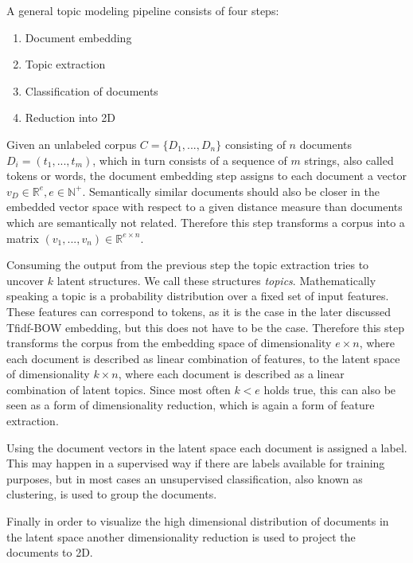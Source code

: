 A general topic modeling pipeline consists of four steps: 
\begin{enumerate}
	\item Document embedding
	\item Topic extraction
	\item Classification of documents
	\item Reduction into 2D
\end{enumerate}

Given an unlabeled corpus $C = \{D_1, ..., D_n\}$ consisting of $n$ documents $D_i = (t_1, ..., t_m)$, which in turn consists of a sequence of $m$ strings, also called tokens or words, the document embedding step assigns to each document a vector $v_D \in \mathbb{R}^e, e \in \mathbb{N}^+$. Semantically similar documents should also be closer in the embedded vector space with respect to a given distance measure than documents which are semantically not related. Therefore this step transforms a corpus into a matrix $(v_1, ..., v_n) \in \mathbb{R}^{e \times n}$.

Consuming the output from the previous step the topic extraction tries to uncover $k$ latent structures. We call these structures \textit{topics}. Mathematically speaking a topic is a probability distribution over a fixed set of input features. \cite{liuOverviewTopicModeling2016} These features can correspond to tokens, as it is the case in the later discussed Tfidf-BOW embedding, but this does not have to be the case. Therefore this step transforms the corpus from the embedding space of dimensionality $e \times n$, where each document is described as linear combination of features, to the latent space of dimensionality $k \times n$, where each document is described as a linear combination of latent topics. Since most often $k < e$ holds true, this can also be seen as a form of dimensionality reduction, which is again a form of feature extraction.

Using the document vectors in the latent space each document is assigned a label. This may happen in a supervised way if there are labels available for training purposes, but in most cases an unsupervised classification, also known as clustering, is used to group the documents.

Finally in order to visualize the high dimensional distribution of documents in the latent space another dimensionality reduction is used to project the documents to 2D.

